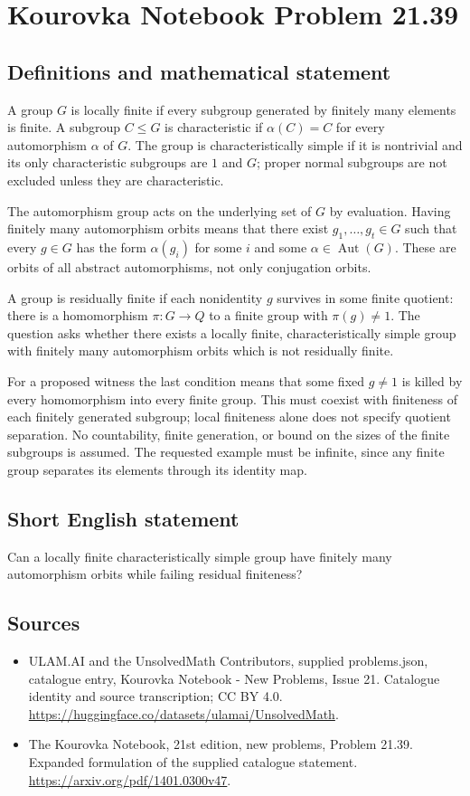\documentclass[11pt,a4paper]{article}
\begin{document}
\section*{Kourovka Notebook Problem 21.39}\label{statement}

\subsection{Definitions and mathematical statement}
A group $G$ is locally finite if every subgroup generated by finitely
many elements is finite. A subgroup $C\le G$ is characteristic if
$\alpha(C)=C$ for every automorphism $\alpha$ of $G$.
The group is characteristically simple if it is nontrivial and its only
characteristic subgroups are $1$ and $G$; proper normal subgroups are
not excluded unless they are characteristic.

The automorphism group acts on the underlying set of $G$ by evaluation.
Having finitely many automorphism orbits means that there exist
$g_1,\ldots,g_t\in G$ such that every $g\in G$ has the form
$\alpha(g_i)$ for some $i$ and some $\alpha\in\operatorname{Aut}(G)$.
These are orbits of all abstract automorphisms, not only conjugation
orbits.

A group is residually finite if each nonidentity $g$ survives in some
finite quotient: there is a homomorphism $\pi:G\to Q$ to a finite group
with $\pi(g)\ne1$. The question asks whether there exists a locally
finite, characteristically simple group with finitely many automorphism
orbits which is not residually finite.

For a proposed witness the last condition means that some fixed
$g\ne1$ is killed by every homomorphism into every finite group.
This must coexist with finiteness of each finitely generated subgroup;
local finiteness alone does not specify quotient separation. No countability,
finite generation, or bound on the sizes of the finite subgroups is
assumed. The requested example must be infinite, since any finite group
separates its elements through its identity map.
\subsection{Short English statement}
Can a locally finite characteristically simple group have finitely many automorphism orbits while failing residual finiteness?
\subsection{Sources}
\begin{itemize}
\item[S1] ULAM.AI and the UnsolvedMath Contributors, supplied problems.json, catalogue entry, Kourovka Notebook - New Problems, Issue 21. Catalogue identity and source transcription; CC BY 4.0.
\url{https://huggingface.co/datasets/ulamai/UnsolvedMath}.
\item[S2] The Kourovka Notebook, 21st edition, new problems, Problem 21.39. Expanded formulation of the supplied catalogue statement.
\url{https://arxiv.org/pdf/1401.0300v47}.
\end{itemize}
\end{document}
